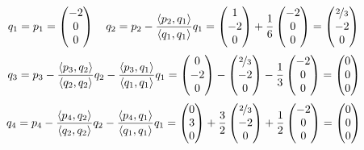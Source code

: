 \documentclass{article}
\begin{document}
    $$q_1 = p_1 = \begin{pmatrix}
            -2 \\ 0 \\ 0
        \end{pmatrix}\quad q_2 = p_2 - \frac{\left\langle p_2, q_1\right\rangle }{\left\langle q_1, q_1\right\rangle}q_1 = \begin{pmatrix}
            1 \\ -2 \\ 0
        \end{pmatrix} + \frac{1}{6}\begin{pmatrix}
            -2 \\ 0 \\ 0
        \end{pmatrix} = \begin{pmatrix}
            \nicefrac{2}{3} \\ -2 \\ 0
        \end{pmatrix}$$
    $$q_3 = p_3 - \frac{\left\langle p_3, q_2\right\rangle }{\left\langle q_2, q_2\right\rangle}q_2- \frac{\left\langle p_3, q_1\right\rangle }{\left\langle q_1, q_1\right\rangle}q_1 = \begin{pmatrix}
            0 \\ -2 \\ 0
        \end{pmatrix} - \begin{pmatrix}
            \nicefrac{2}{3} \\ -2 \\ 0
        \end{pmatrix} - \frac{1}{3}\begin{pmatrix}
            -2 \\ 0 \\ 0
        \end{pmatrix} = \begin{pmatrix}
            0 \\ 0 \\ 0
        \end{pmatrix}$$
    $$q_4 = p_4 -\frac{\left\langle p_4, q_2\right\rangle }{\left\langle q_2, q_2\right\rangle}q_2- \frac{\left\langle p_4, q_1\right\rangle }{\left\langle q_1, q_1\right\rangle}q_1 = \begin{pmatrix}
            0 \\ 3 \\ 0
        \end{pmatrix} + \frac{3}{2}\begin{pmatrix}
            \nicefrac{2}{3} \\ -2 \\ 0
        \end{pmatrix} + \frac{1}{2}\begin{pmatrix}
            -2 \\ 0 \\ 0
        \end{pmatrix} = \begin{pmatrix}
            0 \\ 0 \\ 0
        \end{pmatrix}$$
\end{document}
